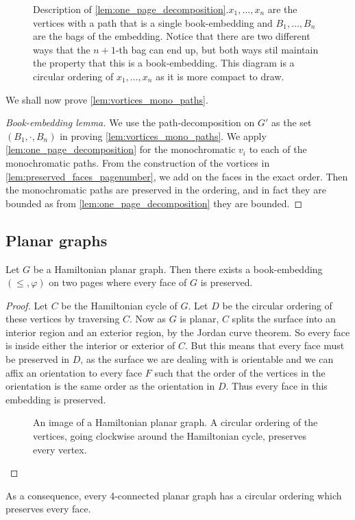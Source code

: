\begin{figure}
	\centering
	
	\caption{Description of \cref{lem:one_page_decomposition}.\(x_1, \ldots, x_n\) are the vertices with a path that is a single book-embedding and \(B_1, \ldots, B_n\) are the bags of the embedding. Notice that there are two different ways that the \(n + 1\)-th bag can end up, but both ways stil maintain the property that this is a book-embedding. This diagram is a circular ordering of \(x_1, \ldots, x_n\) as it is more compact to draw.}\label{fig:preserving_pages}
\end{figure}

We shall now prove \cref{lem:vortices_mono_paths}.
\begin{proof}[Book-embedding lemma]
	We use the path-decomposition on \(G'\) as the set \((B_1, \cdot , B_n)\) in proving \cref{lem:vortices_mono_paths}. We apply \cref{lem:one_page_decomposition} for the monochromatic \(v_i\) to each of the monochromatic paths. From the construction of the vortices in \cref{lem:preserved_faces_pagenumber}, we add on the faces in the exact order. Then the monochromatic paths are preserved in the ordering, and in fact they are bounded as from \cref{lem:one_page_decomposition} they are bounded.
\end{proof}
\subsection{Planar graphs}
\begin{lemma}\label{lem:Hamiltonian_preserved_faces}
	Let \(G\) be a Hamiltonian planar graph. Then there exists a book-embedding $(\leq, \varphi)$ on two pages where every face of $G$ is preserved.
\end{lemma}

\begin{proof}
	Let \(C\) be the Hamiltonian cycle of \(G\). Let \(D\) be the circular ordering of these vertices by traversing \(C\). Now as \(G\) is planar, \(C\) splits the surface into an interior region and an exterior region, by the Jordan curve theorem. So every face is inside either the interior or exterior of \(C\). But this means that every face must be preserved in \(D\), as the surface we are dealing with is orientable and we can affix an orientation to every face \(F\) such that the order of the vertices in the orientation is the same order as the orientation in \(D\). Thus every face in this embedding is preserved.
	\begin{figure}[h]
		\centering
		
		\caption{An image of a Hamiltonian planar graph. A circular ordering of the vertices, going clockwise around the Hamiltonian cycle, preserves every vertex.}\label{fig:hamiltonian_planar}
	\end{figure}
\end{proof}
As a consequence, every 4-connected planar graph has a circular ordering which preserves every face.

